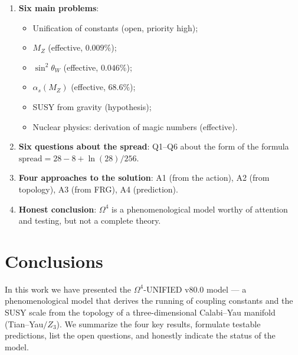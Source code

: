 \documentclass[11pt,a4paper]{article}
\newcommand{\Om}{\ensuremath{\Omega^4}}
\theoremstyle{definition}
\begin{document}
\begin{enumerate}
    \item \textbf{Six main problems}:
          \begin{itemize}
              \item Unification of constants (open, priority high);
              \item $M_Z$ (effective, $0.009\%$);
              \item $\sin^2\theta_W$ (effective, $0.046\%$);
              \item $\alpha_s(M_Z)$ (effective, $68.6\%$);
              \item SUSY from gravity (hypothesis);
              \item Nuclear physics: derivation of magic numbers (effective).
          \end{itemize}
    \item \textbf{Six questions about the spread}: Q1--Q6 about the form
          of the formula $\text{spread} = 28 - 8 + \ln(28)/256$.
    \item \textbf{Four approaches to the solution}: A1 (from the action),
          A2 (from topology), A3 (from FRG), A4 (prediction).
    \item \textbf{Honest conclusion}: $\Om$ is a phenomenological
          model worthy of attention and testing, but
          not a complete theory.
\end{enumerate}

\section{Conclusions}
\label{sec:conclusions}

In this work we have presented the $\Om$-UNIFIED v80.0 model ---
a phenomenological model that derives the running of coupling constants
and the SUSY scale from the topology of a three-dimensional
Calabi--Yau manifold (Tian--Yau$/Z_3$). We summarize the four key
results, formulate testable predictions, list the
open questions, and honestly indicate the status of the model.

\end{document}
